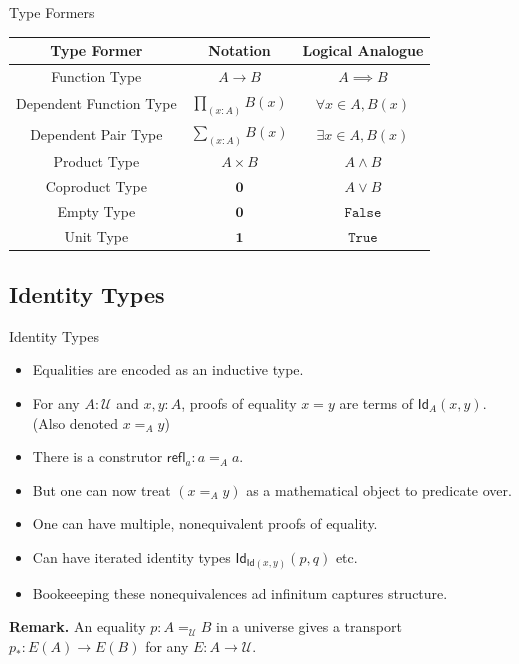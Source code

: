 \documentclass[10pt, aspectratio=43]{beamer}
\newcommand{\U}{\mathcal{U}}
\newcommand{\Prod}[2]{\prod_{(#1)}{#2}}
\newcommand{\Sum}[2]{\sum_{(#1)}{#2}}
\newcommand{\0}{\mathbf{0}}
\newcommand{\1}{\mathbf{1}}
\newcommand{\2}{\mathbf{2}}
\newcommand{\Id}{\mathsf{Id}}
\newcommand{\refl}{\mathsf{refl}}
\begin{document}
\begin{frame}{Type Formers}
  \renewcommand{\arraystretch}{1.2} %
  \setlength{\tabcolsep}{9pt}     %
  \centering
  \begin{tabular}{c  c  c}
  \hline
  \textbf{Type Former} & \textbf{Notation} & \textbf{Logical Analogue} \\
  \hline
  Function Type             & $A \to B$            & $A \implies B$ \\
  Dependent Function Type   & $\Prod{x:A}{B(x)}$ & $\forall x \in A, B(x)$ \\
  Dependent Pair Type       & $\Sum{x:A}{B(x)}$  & $\exists x \in A, B(x)$ \\
  Product Type              & $A \times B$            & $A \land B$ \\
  Coproduct Type            & $\0$               & $A \lor B$ \\
  Empty Type                & $\0$               & $\mathtt{False}$ \\
  Unit Type                 & $\1$               & $\mathtt{True}$ \\
  \hline
  \end{tabular}
\end{frame}

\subsection{Identity Types}

\begin{frame}{Identity Types}
  \begin{itemize}
    \item Equalities are encoded as an inductive type.
    \item For any $A : \U$ and $x, y : A$, proofs of equality $x = y$ are terms of $\Id_A(x,y)$. (Also denoted $x =_A y$)
    \item There is a construtor $\refl_a : a =_A a$.
    \item But one can now treat $(x =_A y)$ as a mathematical object to predicate over.
    \item One can have multiple, nonequivalent proofs of equality.
    \item Can have iterated identity types $\Id_{\Id(x,y)}(p,q)$ etc. 
    \item Bookeeeping these nonequivalences ad infinitum captures structure. 
  \end{itemize}
  \pause
  \textbf{Remark.}
  An equality $p : A =_\U B$ in a universe gives a transport $p_* : E(A) \to E(B)$ for any $E : A \to \U$.
\end{frame}
\end{document}
